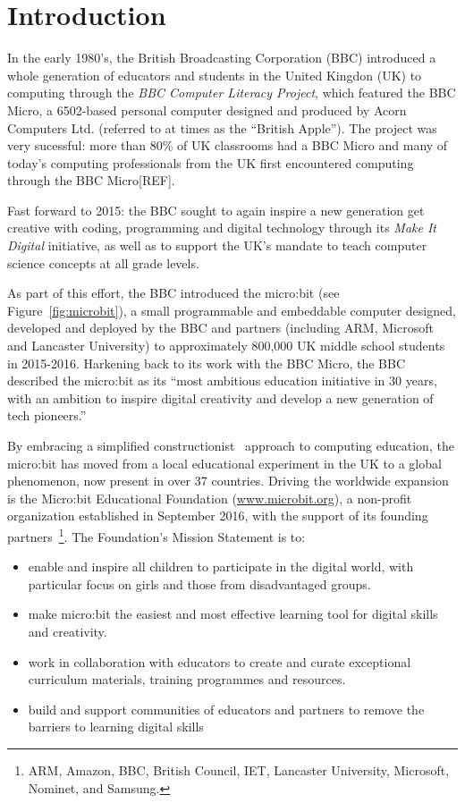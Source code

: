\section{Introduction}
\label{sec:intrp}

In the early 1980's, the British Broadcasting Corporation (BBC)
introduced a whole generation of educators and students in the United Kingdon (UK)
to computing through the {\em BBC Computer Literacy Project}, which featured the BBC Micro,
a 6502-based personal computer designed and produced by Acorn Computers Ltd. (referred
to at times as the ``British Apple'').  The project was very sucessful:
more than 80\% of UK classrooms had a BBC Micro and many of today's
computing professionals from the UK first encountered computing through
the BBC Micro[REF].

Fast forward to 2015: the BBC sought to again inspire a new
generation get creative with coding, programming and digital technology
through its {\em Make It Digital} initiative, as well as to support the UK's mandate to
teach computer science concepts at all grade levels.~\cite{PeytonJones2013ICFP}

As part of this effort, the BBC introduced the micro:bit (see
Figure~\ref{fig:microbit}),
a small programmable and embeddable computer designed,
developed and deployed by the BBC and partners (including ARM, Microsoft
and Lancaster University) to approximately 800,000 UK middle school students
in 2015-2016. Harkening back to its work with the BBC Micro,
the BBC described the micro:bit as its ``most ambitious education initiative in 30 years,
with an ambition to inspire digital creativity and
develop a new generation of tech pioneers.''~\cite{BBCwebsite}

By embracing a simplified constructionist~\cite{Papert} approach to computing education, the micro:bit has moved from
a local educational experiment in the UK to a global phenomenon, now present in over 37 countries.
Driving the worldwide expansion is
the Micro:bit Educational Foundation (\url{www.microbit.org}),
a non-profit organization
established in September 2016, with the support of its founding partners~\footnote{ARM,
Amazon, BBC, British Council, IET, Lancaster University, Microsoft,
Nominet, and Samsung.}.
The Foundation's Mission Statement is to:
\begin{itemize}
\item  enable and inspire all children to participate in the digital world,
with particular focus on girls and those from disadvantaged groups.
\item make micro:bit the easiest and most effective learning tool for digital skills and creativity.
\item work in collaboration with educators to create and curate exceptional
curriculum materials, training programmes and resources.
\item build and support communities of educators and partners
to remove the barriers to learning digital skills
\end{itemize}

